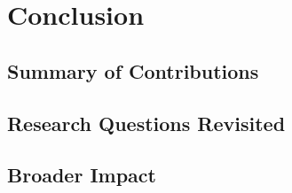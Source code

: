 \chapter{Conclusion}
\label{ch:conclusion}


\section{Summary of Contributions}
\section{Research Questions Revisited}
\section{Broader Impact}
